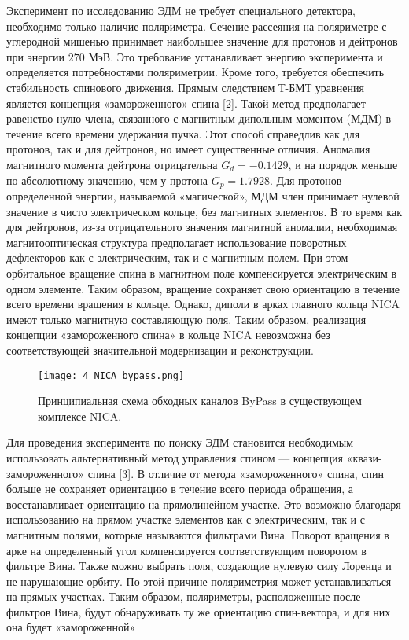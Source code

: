 \par Эксперимент по исследованию ЭДМ не требует специального детектора, необходимо только наличие поляриметра. Сечение рассеяния на поляриметре с углеродной мишенью принимает наибольшее значение для протонов и дейтронов при энергии $270$ МэВ. Это требование устанавливает энергию эксперимента и определяется потребностями поляриметрии.
Кроме того, требуется обеспечить стабильность спинового движения. Прямым следствием Т-БМТ уравнения является концепция «замороженного» спина [2]. Такой метод предполагает равенство нулю члена, связанного с магнитным дипольным моментом (МДМ) в течение всего времени удержания пучка. Этот способ справедлив как для протонов, так и для дейтронов, но имеет существенные отличия. Аномалия магнитного момента дейтрона отрицательна $G_{d}=-0.1429$, и на порядок меньше по абсолютному значению, чем у протона $G_{p}=1.7928$. Для протонов определенной энергии, называемой «магической», МДМ член принимает нулевой значение в чисто электрическом кольце, без магнитных элементов. В то время как для дейтронов, из-за отрицательного значения магнитной аномалии, необходимая магнитооптическая структура предполагает использование поворотных дефлекторов как с электрическим, так и с магнитным полем. При этом орбитальное вращение спина в магнитном поле компенсируется электрическим в одном элементе. Таким образом, вращение сохраняет свою ориентацию в течение всего времени вращения в кольце. Однако, диполи в арках главного кольца NICA имеют только магнитную составляющую поля. Таким образом, реализация концепции «замороженного спина» в кольце NICA невозможна без соответствующей значительной модернизации и реконструкции.

\begin{figure}[!h]
  \centering
   \texttt{[image: 4\_NICA\_bypass.png]}
   \caption{Принципиальная схема обходных каналов ByPass в существующем комплексе NICA.}
   \label{fig:4_NICA_bypass}
\end{figure}

\par Для проведения эксперимента по поиску ЭДМ становится необходимым использовать альтернативный метод управления спином — концепция «квази-замороженного» спина [3]. В отличие от метода «замороженного» спина, спин больше не сохраняет ориентацию в течение всего периода обращения, а восстанавливает ориентацию на прямолинейном участке. Это возможно благодаря использованию на прямом участке элементов как с электрическим, так и с магнитным полями, которые называются фильтрами Вина. Поворот вращения в арке на определенный угол компенсируется соответствующим поворотом в фильтре Вина. Также можно выбрать поля, создающие нулевую силу Лоренца и не нарушающие орбиту. По этой причине поляриметрия может устанавливаться на прямых участках. Таким образом, поляриметры, расположенные после фильтров Вина, будут обнаруживать ту же ориентацию спин-вектора, и для них она будет «замороженной»

